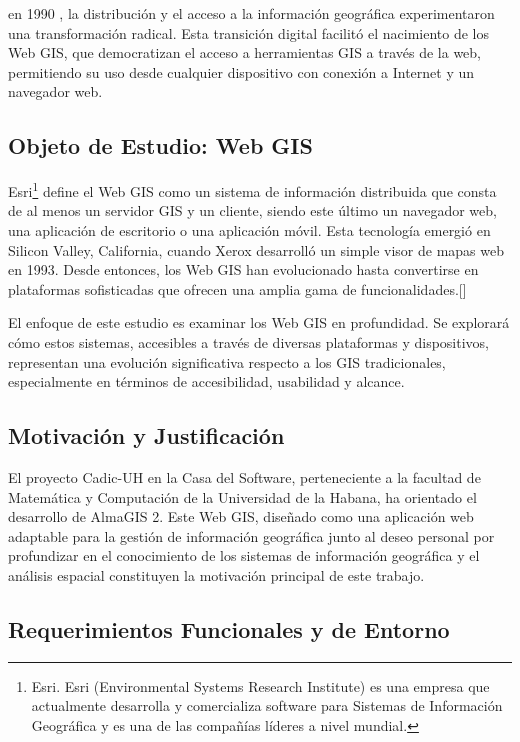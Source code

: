 en 1990 \parencite{abbate-internet}, la distribución y el acceso a la información geográfica
experimentaron una transformación radical. Esta transición digital
facilitó el nacimiento de los Web GIS, que democratizan el acceso a
herramientas GIS a través de la web, permitiendo su uso desde cualquier
dispositivo con conexión a Internet y un navegador web.


\subsection{Objeto de Estudio: Web
GIS}\label{objeto-de-estudio-web-gis}

Esri\footnote{Esri. Esri (Environmental Systems Research Institute) es
  una empresa que actualmente desarrolla y comercializa software para
  Sistemas de Información Geográfica y es una de las compañías líderes a
  nivel mundial.} define el Web GIS como un sistema de información
distribuida que consta de al menos un servidor GIS y un cliente, siendo
este último un navegador web, una aplicación de escritorio o una
aplicación móvil. Esta tecnología emergió en Silicon Valley, California,
cuando Xerox desarrolló un simple visor de mapas web en 1993. Desde
entonces, los Web GIS han evolucionado hasta convertirse en plataformas
sofisticadas que ofrecen una amplia gama de funcionalidades.[\cite{fu-getting-to-know-web-gis}]

El enfoque de este estudio es examinar los Web GIS en profundidad. Se
explorará cómo estos sistemas, accesibles a través de diversas
plataformas y dispositivos, representan una evolución significativa
respecto a los GIS tradicionales, especialmente en términos de
accesibilidad, usabilidad y alcance.


\subsection{Motivación y
Justificación}\label{motivacion-y-justificacion}

El proyecto Cadic-UH en la Casa del Software, perteneciente a la
facultad de Matemática y Computación de la Universidad de la Habana, ha
orientado el desarrollo de AlmaGIS 2. Este Web GIS, diseñado como una
aplicación web adaptable para la gestión de información geográfica junto
al deseo personal por profundizar en el conocimiento de los sistemas de
información geográfica y el análisis espacial constituyen la motivación
principal de este trabajo.


\subsection{Requerimientos Funcionales y de
Entorno}\label{requerimientos-funcionales-y-de-entorno}

